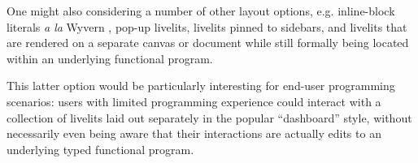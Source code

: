 One might also considering a number of other layout 
options, e.g. inline-block literals \emph{a la} Wyvern \cite{TSLs}, pop-up livelits, livelits pinned to sidebars, and livelits that are rendered  
on a separate canvas or document while still formally being located within an underlying functional program. 

This latter option 
would be particularly interesting for end-user programming scenarios: users with limited
programming experience 
could interact with a collection of livelits laid out separately in the popular ``dashboard'' style, 
without necessarily
even being aware that their interactions are actually edits to an underlying typed
functional program. 



